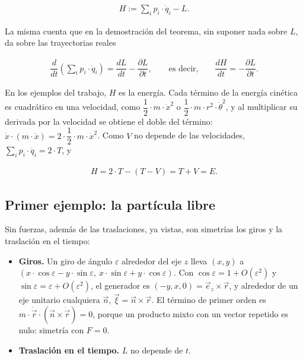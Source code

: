 \documentclass[11pt,a4paper,spanish]{book}
\providecommand{\tightlist}{%
  \setlength{\itemsep}{0pt}\setlength{\parskip}{0pt}}
\begin{document}
\[
\begin{aligned}
H := \sum_i p_i \cdot \dot{q}_i - L.
\end{aligned}
\]

La misma cuenta que en la demostración del teorema, sin suponer nada
sobre \(L\), da sobre las trayectorias reales

\[
\begin{aligned}
\dfrac{d}{dt}\left(\sum_i p_i \cdot \dot{q}_i\right) = \dfrac{dL}{dt} - \dfrac{\partial L}{\partial t}, \qquad \text{es decir,} \qquad \dfrac{dH}{dt} = -\dfrac{\partial L}{\partial t}.
\end{aligned}
\]

En los ejemplos del trabajo, \(H\) es la energía. Cada término de la
energía cinética es cuadrático en una velocidad, como
\(\dfrac{1}{2} \cdot m \cdot \dot{x}^2\) o
\(\dfrac{1}{2} \cdot m \cdot r^2 \cdot \dot{\theta}^2\), y al
multiplicar su derivada por la velocidad se obtiene el doble del
término:
\(\dot{x} \cdot (m \cdot \dot{x}) = 2 \cdot \dfrac{1}{2} \cdot m \cdot \dot{x}^2\).
Como \(V\) no depende de las velocidades,
\(\sum_i p_i \cdot \dot{q}_i = 2 \cdot T\), y

\[
\begin{aligned}
H = 2 \cdot T - (T - V) = T + V = E.
\end{aligned}
\]

\subsection{Primer ejemplo: la partícula
libre}\label{primer-ejemplo-la-partuxedcula-libre}

Sin fuerzas, además de las traslaciones, ya vistas, son simetrías los
giros y la traslación en el tiempo:

\begin{itemize}
\tightlist
\item
  \textbf{Giros.} Un giro de ángulo \(\varepsilon\) alrededor del eje
  \(z\) lleva \((x, y)\) a
  \((x \cdot \cos\varepsilon - y \cdot \sin\varepsilon,\ x \cdot \sin\varepsilon + y \cdot \cos\varepsilon)\).
  Con \(\cos\varepsilon = 1 + O(\varepsilon^2)\) y
  \(\sin\varepsilon = \varepsilon + O(\varepsilon^2)\), el generador es
  \((-y, x, 0) = \vec{e}_z \times \vec{r}\), y alrededor de un eje
  unitario cualquiera \(\vec{n}\),
  \(\vec{\xi} = \vec{n} \times \vec{r}\). El término de primer orden es
  \(m \cdot \dot{\vec{r}} \cdot (\vec{n} \times \dot{\vec{r}}) = 0\),
  porque un producto mixto con un vector repetido es nulo: simetría con
  \(F = 0\).
\item
  \textbf{Traslación en el tiempo.} \(L\) no depende de \(t\).
\end{itemize}
\end{document}
